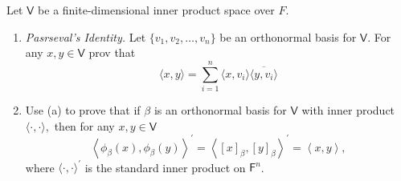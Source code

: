 Let $\mathsf{V}$ be a finite-dimensional inner product space over $F.$
\begin{enumerate}
\item {\it Pasrseval's Identity.} Let $\{v_1,v_2,\dotsc,v_n\}$ be an
orthonormal basis for $\mathsf{V}.$ For any $x,y \in \mathsf{V}$ prov
that
\[
\langle x,y \rangle = \sum\limits_{i=1}^n \langle x,v_i\rangle
\overline{\langle y,v_i\rangle}
\]
\item Use (a) to prove that if $\beta$ is an orthonormal basis for
  $\mathsf{V}$ with inner product $\langle \cdot, \cdot \rangle,$ then
  for any $x,y \in \mathsf{V}$
\[
\left\langle \phi_\beta(x),\phi_\beta(y)\right\rangle^\prime = \left\langle
[x]_\beta,[y]_\beta\right\rangle^\prime = \left\langle x,y \right\rangle,
\]
where $\langle \cdot,\cdot\rangle^\prime$ is the standard inner
product on $\mathsf{F}^n$.
\end{enumerate}
